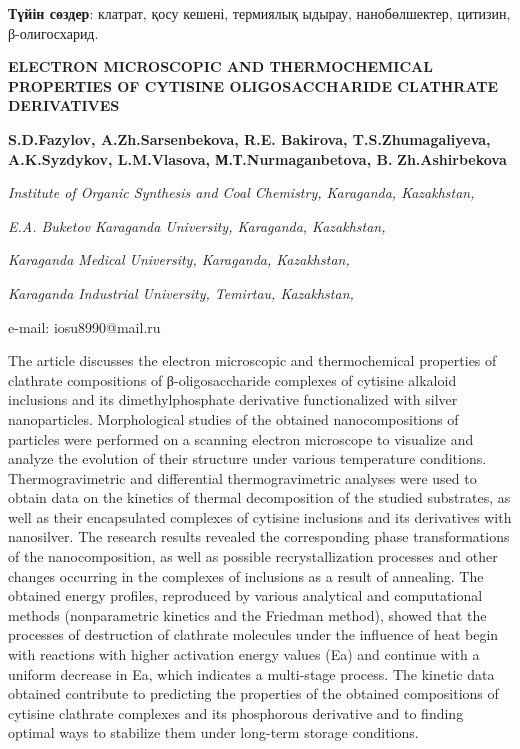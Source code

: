 {\bfseries Түйін сөздер}: клатрат, қосу кешені, термиялық ыдырау,
нанобөлшектер, цитизин, β-олигосхарид.

{\bfseries ELECTRON MICROSCOPIC AND THERMOCHEMICAL PROPERTIES OF CYTISINE
OLIGOSACCHARIDE CLATHRATE DERIVATIVES}

{\bfseries {}S.D.Fazylov\envelope ,
A.Zh.Sarsenbekova, R.E. Bakirova,
T.S.Zhumagaliyeva, A.K.Syzdykov,
L.M.Vlasova, М.Т.Nurmaganbetova,
B.} {\bfseries Zh.Ashirbekova}

\emph{Institute of Organic Synthesis and Coal
Chemistry, Karaganda, Kazakhstan,}

\emph{E.A. Buketov Karaganda University, Karaganda,
Kazakhstan,}

\emph{Karaganda Medical University, Karaganda,
Kazakhstan,}

\emph{Karaganda Industrial University, Temirtau,
Kazakhstan,}

e-mail: iosu8990@mail.ru

The article discusses the electron microscopic and thermochemical
properties of clathrate compositions of β-oligosaccharide complexes of
cytisine alkaloid inclusions and its dimethylphosphate derivative
functionalized with silver nanoparticles. Morphological studies of the
obtained nanocompositions of particles were performed on a scanning
electron microscope to visualize and analyze the evolution of their
structure under various temperature conditions. Thermogravimetric and
differential thermogravimetric analyses were used to obtain data on the
kinetics of thermal decomposition of the studied substrates, as well as
their encapsulated complexes of cytisine inclusions and its derivatives
with nanosilver. The research results revealed the corresponding phase
transformations of the nanocomposition, as well as possible
recrystallization processes and other changes occurring in the complexes
of inclusions as a result of annealing. The obtained energy profiles,
reproduced by various analytical and computational methods
(nonparametric kinetics and the Friedman method), showed that the
processes of destruction of clathrate molecules under the influence of
heat begin with reactions with higher activation energy values (Ea) and
continue with a uniform decrease in Ea, which indicates a multi-stage
process. The kinetic data obtained contribute to predicting the
properties of the obtained compositions of cytisine clathrate complexes
and its phosphorous derivative and to finding optimal ways to stabilize
them under long-term storage conditions.

